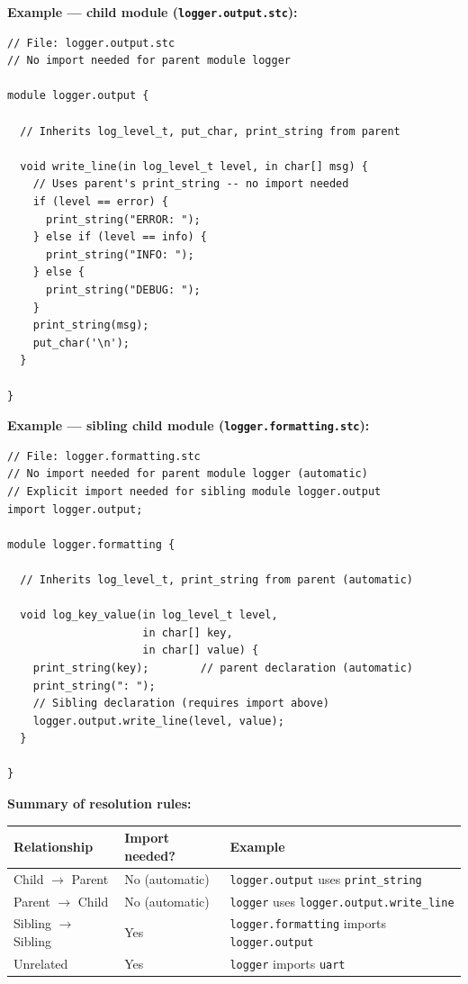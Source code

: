 \documentclass[11pt,letterpaper,twoside,openany]{book}
\begin{document}
\textbf{Example --- child module (\texttt{logger.output.stc}):}

\begin{lstlisting}
// File: logger.output.stc
// No import needed for parent module logger

module logger.output {

  // Inherits log_level_t, put_char, print_string from parent

  void write_line(in log_level_t level, in char[] msg) {
    // Uses parent's print_string -- no import needed
    if (level == error) {
      print_string("ERROR: ");
    } else if (level == info) {
      print_string("INFO: ");
    } else {
      print_string("DEBUG: ");
    }
    print_string(msg);
    put_char('\n');
  }

}
\end{lstlisting}

\textbf{Example --- sibling child module (\texttt{logger.formatting.stc}):}

\begin{lstlisting}
// File: logger.formatting.stc
// No import needed for parent module logger (automatic)
// Explicit import needed for sibling module logger.output
import logger.output;

module logger.formatting {

  // Inherits log_level_t, print_string from parent (automatic)

  void log_key_value(in log_level_t level,
                     in char[] key,
                     in char[] value) {
    print_string(key);        // parent declaration (automatic)
    print_string(": ");
    // Sibling declaration (requires import above)
    logger.output.write_line(level, value);
  }

}
\end{lstlisting}

\textbf{Summary of resolution rules:}

\begin{center}
\begin{tabular}{lll}
\textbf{Relationship} & \textbf{Import needed?} & \textbf{Example} \\
\hline
Child $\to$ Parent & No (automatic) & \verb'logger.output' uses \verb'print_string' \\
Parent $\to$ Child & No (automatic) & \verb'logger' uses \verb'logger.output.write_line' \\
Sibling $\to$ Sibling & Yes & \verb'logger.formatting' imports \verb'logger.output' \\
Unrelated & Yes & \verb'logger' imports \verb'uart' \\
\end{tabular}
\end{center}
\end{document}
